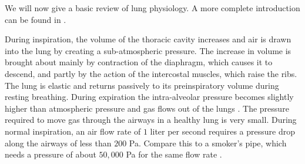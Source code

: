 We will now give a basic review of lung physiology. A more complete introduction can be found in \cite{west2008respiratory}.
 
During inspiration, the volume of the thoracic cavity increases and air is drawn into the lung by creating a sub-atmospheric pressure. The increase in volume is brought about mainly by contraction of the diaphragm, which causes it to descend, and partly by the action of the intercostal muscles, which raise the ribs. 
The lung is elastic and returns passively to its preinspiratory volume during resting breathing. 
During expiration the intra-alveolar pressure becomes slightly higher than atmospheric pressure and gas flows out of the
lungs \cite{west2008respiratory}. 
The pressure required to move gas through the airways in a healthy lung is very small. During normal inspiration, an air flow rate of $1$ liter per second requires a pressure drop along the airways of less than $200$ Pa. Compare this to a smoker’s pipe, which needs a pressure of about $50,000$ Pa for the same flow rate \cite{west2008respiratory}.

